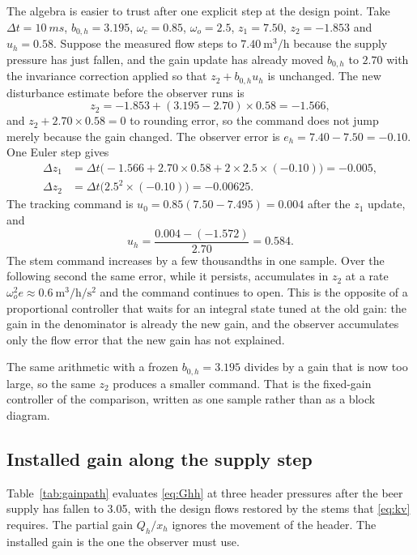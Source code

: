 The algebra is easier to trust after one explicit step at the design point. Take $\Delta t=\SI{10}{ms}$, $b_{0,h}=3.195$, $\omega_c=0.85$, $\omega_o=2.5$, $z_1=7.50$, $z_2=-1.853$ and $u_h=0.58$. Suppose the measured flow steps to $7.40\ \si{\cubic\metre\per\hour}$ because the supply pressure has just fallen, and the gain update has already moved $b_{0,h}$ to $2.70$ with the invariance correction applied so that $z_2+b_{0,h}u_h$ is unchanged. The new disturbance estimate before the observer runs is
\begin{equation}
z_2 = -1.853 + (3.195-2.70)\times 0.58 = -1.566,
\end{equation}
and $z_2 + 2.70\times 0.58 = 0$ to rounding error, so the command does not jump merely because the gain changed. The observer error is $e_h = 7.40-7.50 = -0.10$. One Euler step gives
\begin{align}
\Delta z_1 &= \Delta t\big(-1.566 + 2.70\times 0.58 + 2\times 2.5\times(-0.10)\big) = -0.005,\\
\Delta z_2 &= \Delta t\big(2.5^2\times(-0.10)\big) = -0.00625.
\end{align}
The tracking command is $u_0 = 0.85(7.50-7.495) = 0.004$ after the $z_1$ update, and
\begin{equation}
u_h = \frac{0.004 - (-1.572)}{2.70} = 0.584.
\end{equation}
The stem command increases by a few thousandths in one sample. Over the following second the same error, while it persists, accumulates in $z_2$ at a rate $\omega_o^2 e \approx 0.6\ \si{\cubic\metre\per\hour\per\second\squared}$ and the command continues to open. This is the opposite of a proportional controller that waits for an integral state tuned at the old gain: the gain in the denominator is already the new gain, and the observer accumulates only the flow error that the new gain has not explained.

The same arithmetic with a frozen $b_{0,h}=3.195$ divides by a gain that is now too large, so the same $z_2$ produces a smaller command. That is the fixed-gain controller of the comparison, written as one sample rather than as a block diagram.

\subsection{Installed gain along the supply step}

Table~\ref{tab:gainpath} evaluates \eqref{eq:Ghh} at three header pressures after the beer supply has fallen to \SI{3.05}{\barg}, with the design flows restored by the stems that \eqref{eq:kv} requires. The partial gain $Q_h/x_h$ ignores the movement of the header. The installed gain is the one the observer must use.

